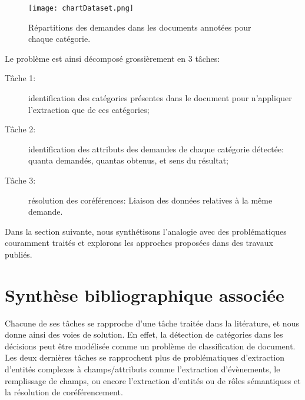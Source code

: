 \begin{figure}[h!]
\texttt{[image: chartDataset.png]}
\caption{Répartitions des demandes dans les documents annotées pour chaque catégorie.}\label{fig:quanta:hist-repartition-docs}
\end{figure}

Le problème est ainsi décomposé grossièrement en 3 tâches:
\begin{description}
\item[Tâche 1:] identification des catégories présentes dans le document pour n'appliquer l'extraction  que de ces catégories;
\item[Tâche 2:] identification des attributs des demandes de chaque catégorie détectée: quanta demandés, quantas obtenus, et sens du résultat;
\item[Tâche 3:] résolution des coréférences: Liaison des données relatives à la même demande.
\end{description}



 Dans la section suivante, nous synthétisons l'analogie avec des problématiques couramment traités et explorons les approches proposées dans des travaux publiés.

\section{Synthèse bibliographique associée}
\label{sec:quanta:biblio}
Chacune de ses tâches se rapproche d'une tâche traitée dans la litérature, et nous donne ainsi des voies de solution. En effet, la détection de catégories dans les décisions peut être modélisée comme un problème de classification de document. Les deux dernières tâches se rapprochent plus de problématiques d'extraction d'entités complexes à champs/attributs comme l'extraction d'évènements, le remplissage de champs, ou encore l'extraction d'entités ou de rôles sémantiques et la résolution de coréférencement.

